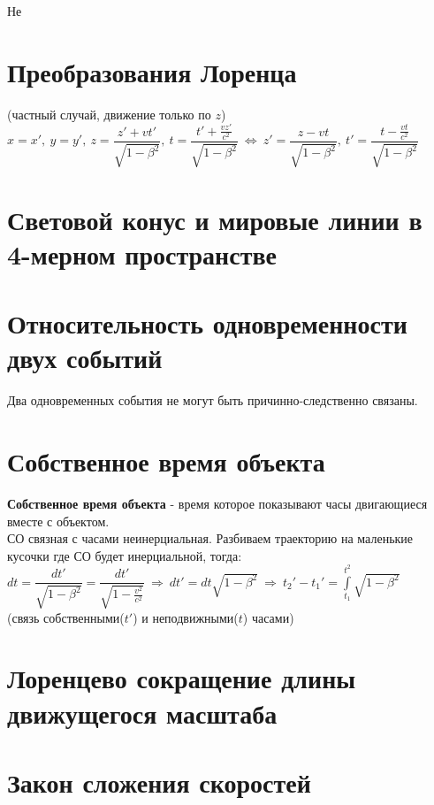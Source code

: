 \begin{multicols*}{2}
		Не
		
		\section{Преобразования Лоренца}
		
		(частный случай, движение только по $ z $) \\ 
		$ x=x',~ y=y',~ z=\dfrac{z'+vt'}{\sqrt{1-\beta^2}},~ t=\dfrac{t'+\frac{vz'}{c^2}}{\sqrt{1-\beta^2}}~\Leftrightarrow~ z'=\dfrac{z-vt}{\sqrt{1-\beta^2}},~ t'=\dfrac{t-\frac{vt}{c^2}}{\sqrt{1-\beta^2}} $
		
		\section{Световой конус и мировые линии в 4-мерном пространстве}
		
		\section{Относительность одновременности двух событий}
		
		Два одновременных события не могут быть причинно-следственно связаны.
		
		\section{Собственное время объекта}
		
		\textbf{Собственное время объекта} - время которое показывают часы двигающиеся вместе с объектом. \\
		СО  связная с часами неинерциальная. Разбиваем траекторию на маленькие кусочки где СО будет инерциальной, тогда: \\
		$ dt=\dfrac{dt'}{\sqrt{1-\beta^2}} = \dfrac{dt'}{\sqrt{1-\frac{v^2}{c^2}}} ~\Rightarrow~ dt'=dt\sqrt{1-\beta^2} ~\Rightarrow~ t_2'-t_1' = \int\limits_{t_1}^{t^2}\sqrt{1-\beta^2} $ \\
		(связь собственными($ t' $) и неподвижными($ t $) часами)
		
		\section{Лоренцево сокращение длины движущегося масштаба}
		
		\section{Закон сложения скоростей}
		

\end{multicols*}
